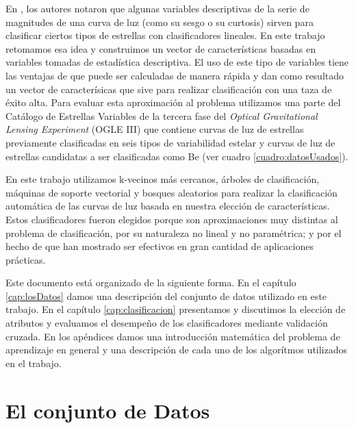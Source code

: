 \documentclass[letterpaper,12pt]{book}
\begin{document}
En \cite{rodriguez_feliciano_alisis_2012, sabogal_search_2014}, los autores notaron que algunas variables descriptivas de la serie de magnitudes de una curva de luz (como su sesgo o su curtosis) sirven para clasificar ciertos tipos de estrellas con clasificadores lineales. En este trabajo retomamos esa idea y construimos un vector de características basadas en variables tomadas de estadística descriptiva. El uso de este tipo de variables tiene las ventajas de que puede ser calculadas de manera rápida y dan como resultado un vector de caracterísicas que sive para realizar clasificación con una taza de éxito alta. Para evaluar esta aproximación al problema utilizamos una parte del Catálogo de Estrellas Variables de la tercera fase del \textit{Optical Gravitational Lensing Experiment} (OGLE III)\cite{soszynski_optical_2011-2,soszynski_optical_2010,soszynski_optical_2009-1,soszynski_optical_2011,soszynski_optical_2010-2,soszynski_optical_2008-1,soszynski_optical_2013-1,soszynski_optical_2011-1,soszynski_optical_2009,pawlak_eclipsing_2013,graczyk_optical_2011,poleski_optical_2010,soszynski_optical_2013,soszynski_optical_2010-1,soszynski_optical_2008} que contiene curvas de luz  de estrellas previamente clasificadas en seis tipos de variabilidad estelar y curvas de luz de estrellas candidatas a ser clasificadas como Be (ver cuadro \ref{cuadro:datosUsados}).

En este trabajo utilizamos k-vecinos más cercanos, árboles de clasificación, máquinas de soporte vectorial y bosques aleatorios para realizar la clasificación automática de las curvas de luz basada en nuestra elección de características. Estos clasificadores fueron elegidos porque son aproximaciones muy distintas al problema de clasificación, por su naturaleza no lineal y no paramétrica; y por el hecho de que han mostrado ser efectivos en gran cantidad de aplicaciones prácticas. 

Este documento está organizado de la siguiente forma. En el capítulo \ref{cap:losDatos} damos una descripción del conjunto de datos utilizado en este trabajo. En el capítulo \ref{cap:clasificacion} presentamos y discutimos la elección de atributos y evaluamos el desempeño de los clasificadores mediante validación cruzada. En los apéndices damos una introducción matemática del problema de aprendizaje en general y una descripción de cada uno de los algorítmos utilizados en el trabajo.




\chapter{El conjunto de Datos\label{cap:losDatos}}
\end{document}
